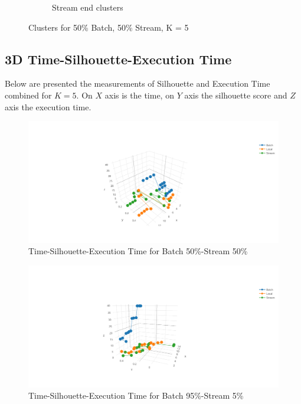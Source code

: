 \documentclass{lmproj}
\begin{document}
\begin{figure}[H]
\begin{subfigure}{.5\textwidth}
		\caption*{Stream end clusters}
		\label{fig:stream_50_50_k_5_end}
	\end{subfigure}
	\caption{Clusters for 50\% Batch, 50\% Stream, K = 5}
	\label{fig:clusters_k_5_50_50}
\end{figure}


\subsection{3D Time-Silhouette-Execution Time}

Below are presented the measurements of Silhouette and Execution Time combined for $K = 5$. On $X$ axis is the time, on $Y$ axis the silhouette score and $Z$ axis the execution time.

\bigskip

\begin{figure}[H]
	\centering	
	\includegraphics[scale=0.5]{3d/k_5_f_50_50}
	\caption{Time-Silhouette-Execution Time for Batch 50\%-Stream 50\%}
\end{figure}

\bigskip

\begin{figure}[H]
	\centering	
	\includegraphics[scale=0.5]{3d/k_5_f_95_5}
	\caption{Time-Silhouette-Execution Time for Batch 95\%-Stream 5\%}
\end{figure}
\end{document}

